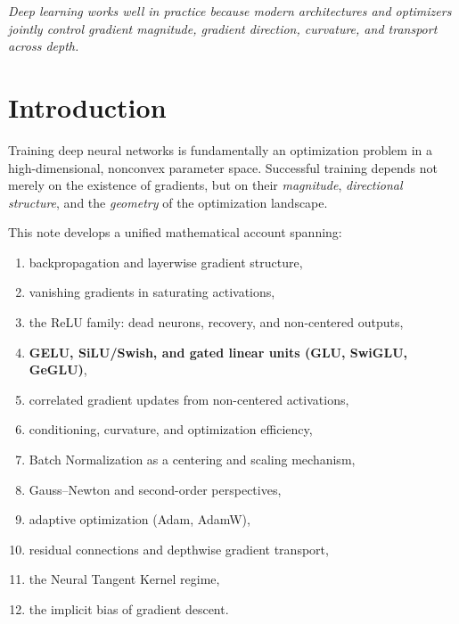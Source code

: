 \documentclass[12pt,a4paper]{article}
\theoremstyle{definition}
\theoremstyle{remark}
\begin{document}
\begin{titlepage}
\vfill
\begin{center}
\color{keyblue!60!black}\small
\textit{Deep learning works well in practice because modern architectures and optimizers jointly control gradient magnitude, gradient direction, curvature, and transport across depth.}
\end{center}
\vspace{1.5cm}
\end{titlepage}

\newpage
\tableofcontents
\newpage

\section{Introduction}

Training deep neural networks is fundamentally an optimization problem in a high-dimensional, nonconvex parameter space. Successful training depends not merely on the existence of gradients, but on their \emph{magnitude}, \emph{directional structure}, and the \emph{geometry} of the optimization landscape.

This note develops a unified mathematical account spanning:

\begin{enumerate}
    \item backpropagation and layerwise gradient structure,
    \item vanishing gradients in saturating activations,
    \item the ReLU family: dead neurons, recovery, and non-centered outputs,
    \item \textbf{GELU, SiLU/Swish, and gated linear units (GLU, SwiGLU, GeGLU)},
    \item correlated gradient updates from non-centered activations,
    \item conditioning, curvature, and optimization efficiency,
    \item Batch Normalization as a centering and scaling mechanism,
    \item Gauss--Newton and second-order perspectives,
    \item adaptive optimization (Adam, AdamW),
    \item residual connections and depthwise gradient transport,
    \item the Neural Tangent Kernel regime,
    \item the implicit bias of gradient descent.
\end{enumerate}
\end{document}

